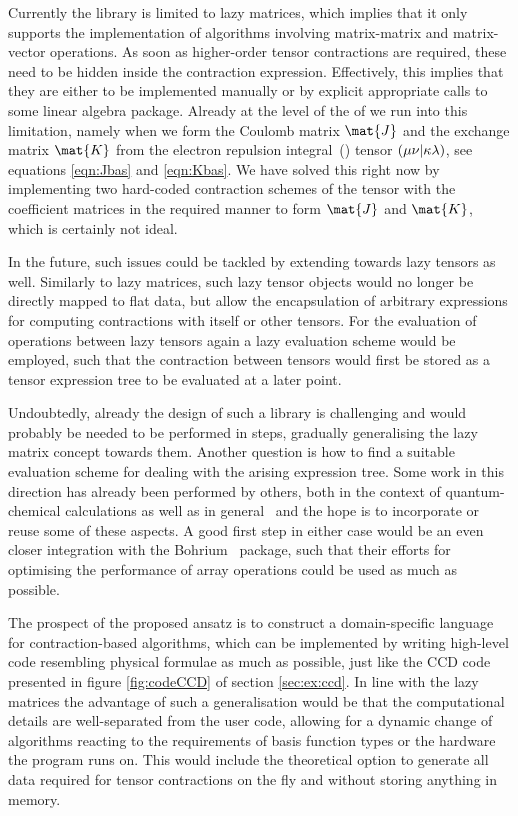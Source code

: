 Currently the \lazyten library is limited to lazy matrices,
which implies that it only supports the implementation of algorithms
involving matrix-matrix and matrix-vector operations.
As soon as higher-order tensor contractions are required,
these need to be hidden inside the contraction expression.
Effectively, this implies
that they are either to be implemented manually
or by explicit appropriate calls to some linear algebra package.
Already at the level of the \SCF of \molsturm we run into this limitation,
namely when we form the Coulomb matrix $\mat{J}$
and the exchange matrix $\mat{K}$ from the electron repulsion integral~(\ERI) tensor
$\left( \mu\nu \middle| \kappa\lambda \right)$, see equations \eqref{eqn:Jbas} and \eqref{eqn:Kbas}.
We have solved this right now by implementing two
hard-coded contraction schemes of the \ERI tensor with
the coefficient matrices in the required manner to form $\mat{J}$ and $\mat{K}$,
which is certainly not ideal.

In the future, such issues could be tackled
by extending \lazyten towards lazy tensors as well.
Similarly to lazy matrices,
such lazy tensor objects would no longer be directly mapped to flat data,
but allow the encapsulation of arbitrary expressions
for computing contractions with itself or other tensors.
For the evaluation of operations between lazy tensors
again a lazy evaluation scheme would be employed,
such that the contraction between tensors would first be
stored as a tensor expression tree to be evaluated at a later point.

Undoubtedly, already the design of such a library is challenging
and would probably be needed to be performed in steps,
gradually generalising the lazy matrix concept towards them.
Another question is how to find a suitable evaluation
scheme for dealing with the arising expression tree.
Some work in this direction has already been performed by others,
both in the context of quantum-chemical calculations
as well as in general~\cite{Baumgartner2005,Solomonik2014,%
Peise2015,Calvin2015,Calvin2015arxiv,Xerus,Kristensen2016array,%
Kristensen2016streaming,Libtensor}
and the hope is to incorporate or reuse some of these aspects.
A good first step in either case would be an even closer integration
with the Bohrium~\cite{Kristensen2016array,Kristensen2016streaming} package,
such that their efforts for optimising the performance
of array operations could be used as much as possible.

The prospect of the proposed ansatz is to construct a domain-specific language
for contraction-based algorithms,
which can be implemented by writing high-level code
resembling physical formulae as much as possible,
just like the CCD code presented in figure \ref{fig:codeCCD}
of section \ref{sec:ex:ccd}.
In line with the lazy matrices the advantage of such a
generalisation would be that the computational details
are well-separated from the user code,
allowing for a dynamic change of algorithms
reacting to the requirements of basis function types
or the hardware the program runs on.
This would include the theoretical option to generate all data required for tensor
contractions on the fly and without storing anything in memory.


